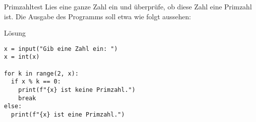 \begin{fragile}
\begin{block}{Primzahltest}
\vspace{2pt}
Lies eine ganze Zahl  ein und überprüfe, ob diese Zahl eine Primzahl ist. Die Ausgabe des Programms soll etwa wie folgt aussehen:  

\end{block}

\vspace{12pt}
\begin{solutionblock}{Lösung}
\begin{verbatim}
x = input("Gib eine Zahl ein: ")
x = int(x)

for k in range(2, x):
  if x % k == 0:
    print(f"{x} ist keine Primzahl.")
    break
else:
  print(f"{x} ist eine Primzahl.")
\end{verbatim}
\end{solutionblock}

\end{fragile}




